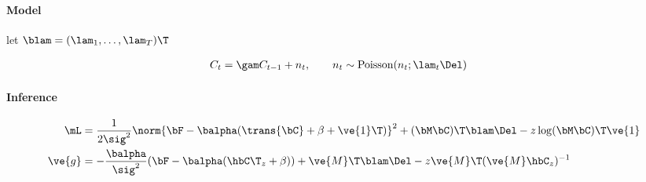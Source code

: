 \paragraph{Model}

let $\blam = (\lam_1, \ldots, \lam_T)\T$

\begin{align}
	C_t &= \gam C_{t-1} + n_t, \qquad n_t \sim \text{Poisson}(n_t; \lam_t \Del)
\end{align}

\paragraph{Inference}

\begin{subequations} 
\begin{align}
\mL &=  \frac{1}{2 \sig^2} \norm{\bF - \balpha (\trans{\bC} +\beta+\ve{1}\T)}^2 + (\bM \bC )\T \blam \Del  - \zzz \log(\bM \bC)\T\ve{1} \\
\ve{g} &= -\frac{\balpha}{\sig^2}(\bF -\balpha({\hbC\T}_{\zzz} + \beta)) + \ve{M}\T \blam \Del  - \zzz \ve{M}\T (\ve{M} \hbC_{\zzz})^{-1}
\end{align}
\end{subequations}
